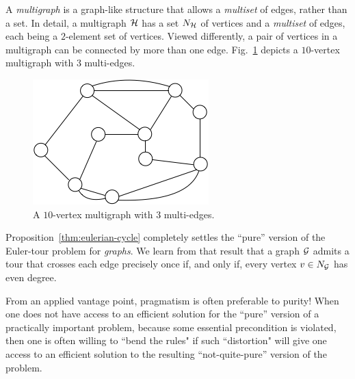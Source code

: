 A {\it multigraph} is a graph-like structure that allows a {\em multiset} of edges, rather than a set.  In detail, a multigraph $\mbox{$\cal H$}$ has a set $N_{\mbox{{\scriptsize $\cal H$}}}$ of vertices and a {\em multiset} of edges, each being a $2$-element set of vertices.  Viewed differently, a pair of vertices in a multigraph can be connected by more than one edge.  Fig.~\ref{fig:EulerianFinal} depicts a $10$-vertex multigraph
with $3$ multi-edges.
 \begin{figure}[hbt]
\begin{center}
       \includegraphics[scale=0.4]{FiguresGraph/EulerienFinal}
       \caption{A $10$-vertex multigraph with $3$ multi-edges.}
              \label{fig:EulerianFinal}
\end{center}
\end{figure}

\smallskip

Proposition~\ref{thm:eulerian-cycle} completely settles the ``pure'' version of the Euler-tour problem for {\em graphs}.  We learn from that result that a graph $\mbox{$\cal G$}$ admits a tour that crosses each edge precisely once if, and only if, every vertex $v \in N_{\mbox{{\scriptsize $\cal G$}}}$ has even degree.

From an applied vantage point, pragmatism is often preferable to purity!  When one does not have access to an efficient solution for the ``pure'' version of a practically important problem, because some essential precondition is violated, then one is often willing to ``bend the rules" if such ``distortion" will give one access to an efficient solution to the resulting ``not-quite-pure'' version of the problem. 

\medskip

